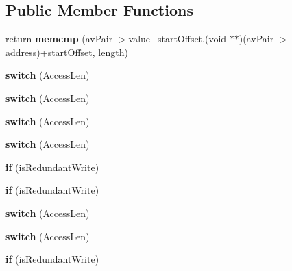 \subsection*{Public Member Functions}
\begin{DoxyCompactItemize}
\item 
\hypertarget{structRedSpyAnalysis_a131efa9f33881101897248a3db15f965}{return {\bfseries memcmp} (av\-Pair-\/$>$value+start\-Offset,(void $\ast$$\ast$)(av\-Pair-\/$>$address)+start\-Offset, length)}\label{structRedSpyAnalysis_a131efa9f33881101897248a3db15f965}

\item 
\hypertarget{structRedSpyAnalysis_a4ea5909f3cc16bc7dbe08fc85a9d0576}{{\bfseries switch} (Access\-Len)}\label{structRedSpyAnalysis_a4ea5909f3cc16bc7dbe08fc85a9d0576}

\item 
\hypertarget{structRedSpyAnalysis_a4ea5909f3cc16bc7dbe08fc85a9d0576}{{\bfseries switch} (Access\-Len)}\label{structRedSpyAnalysis_a4ea5909f3cc16bc7dbe08fc85a9d0576}

\item 
\hypertarget{structRedSpyAnalysis_a4ea5909f3cc16bc7dbe08fc85a9d0576}{{\bfseries switch} (Access\-Len)}\label{structRedSpyAnalysis_a4ea5909f3cc16bc7dbe08fc85a9d0576}

\item 
\hypertarget{structRedSpyAnalysis_a4ea5909f3cc16bc7dbe08fc85a9d0576}{{\bfseries switch} (Access\-Len)}\label{structRedSpyAnalysis_a4ea5909f3cc16bc7dbe08fc85a9d0576}

\item 
\hypertarget{structRedSpyAnalysis_a629b6a8fb4e354e0b7c1acd2acb66598}{{\bfseries if} (is\-Redundant\-Write)}\label{structRedSpyAnalysis_a629b6a8fb4e354e0b7c1acd2acb66598}

\item 
\hypertarget{structRedSpyAnalysis_a629b6a8fb4e354e0b7c1acd2acb66598}{{\bfseries if} (is\-Redundant\-Write)}\label{structRedSpyAnalysis_a629b6a8fb4e354e0b7c1acd2acb66598}

\item 
\hypertarget{structRedSpyAnalysis_a4ea5909f3cc16bc7dbe08fc85a9d0576}{{\bfseries switch} (Access\-Len)}\label{structRedSpyAnalysis_a4ea5909f3cc16bc7dbe08fc85a9d0576}

\item 
\hypertarget{structRedSpyAnalysis_a4ea5909f3cc16bc7dbe08fc85a9d0576}{{\bfseries switch} (Access\-Len)}\label{structRedSpyAnalysis_a4ea5909f3cc16bc7dbe08fc85a9d0576}

\item 
\hypertarget{structRedSpyAnalysis_a629b6a8fb4e354e0b7c1acd2acb66598}{{\bfseries if} (is\-Redundant\-Write)}\label{structRedSpyAnalysis_a629b6a8fb4e354e0b7c1acd2acb66598}

\end{DoxyCompactItemize}
